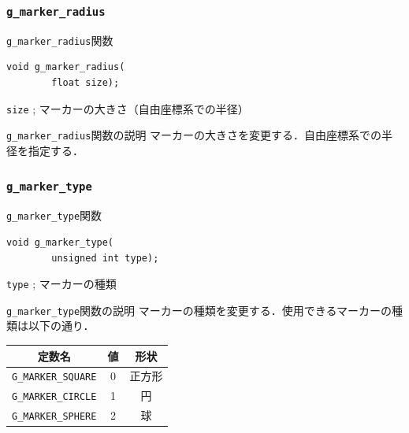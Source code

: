 \documentclass[platex,a4paper,12pt]{jsarticle}%
\begin{document}
\subsubsection{\texttt{g\_marker\_radius}}

\begin{itembox}[l]{\texttt{g\_marker\_radius}関数}
\begin{verbatim}
void g_marker_radius(
        float size);
\end{verbatim}
\verb|size| ; マーカーの大きさ（自由座標系での半径）
\end{itembox}

\begin{itembox}[l]{\texttt{g\_marker\_radius}関数の説明}
	マーカーの大きさを変更する．自由座標系での半径を指定する．
\end{itembox}

\clearpage

\subsubsection{\texttt{g\_marker\_type}}

\begin{itembox}[l]{\texttt{g\_marker\_type}関数}
\begin{verbatim}
void g_marker_type(
        unsigned int type);
\end{verbatim}
\verb|type| ; マーカーの種類
\end{itembox}

\begin{itembox}[l]{\texttt{g\_marker\_type}関数の説明}
マーカーの種類を変更する．使用できるマーカーの種類は以下の通り．
\begin{center}
\begin{tabular}{|c|c|c|}
	\hline 
	定数名 & 値 & 形状 \\ 
	\hline 
	\verb|G_MARKER_SQUARE| & 0 & 正方形 \\ 
	\hline 
	\verb|G_MARKER_CIRCLE| & 1 & 円 \\ 
	\hline 
	\verb|G_MARKER_SPHERE| & 2 & 球 \\ 
	\hline 
\end{tabular}
\end{center}
\end{itembox}
\end{document}
